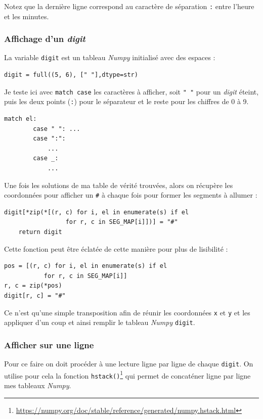 Notez que la dernière ligne correspond au caractère de séparation \og \texttt{:}\fg{} entre l'heure et les minutes.
\medskip

\subsubsection*{\textbullet{} Affichage d'un \textit{digit}}
La variable \texttt{digit} est un tableau \textit{Numpy} initialisé avec des espaces :
\begin{verbatim}
digit = full((5, 6), [" "],dtype=str)
\end{verbatim}
\medskip

Je teste ici avec \texttt{match case} les caractères à afficher, soit \texttt{" "} pour un \textit{digit} \og éteint\fg{}, puis les deux points (\og \texttt{:}\fg{}) pour le séparateur et le reste pour les chiffres de 0 à 9.
\begin{verbatim}
match el:
        case " ": ...
        case ":":
            ...
        case _:
            ...
\end{verbatim}
\medskip

Une fois les solutions de ma table de vérité trouvées, alors on récupère les coordonnées pour afficher un \og \texttt{\#}\fg{} à chaque fois pour former les segments à allumer :
\begin{lstlisting}
digit[*zip(*[(r, c) for i, el in enumerate(s) if el
                 for r, c in SEG_MAP[i]])] = "#"
    return digit
\end{lstlisting}
\medskip

Cette fonction peut être éclatée de cette manière pour plus de lisibilité :
\begin{lstlisting}
pos = [(r, c) for i, el in enumerate(s) if el 
           for r, c in SEG_MAP[i]]
r, c = zip(*pos)
digit[r, c] = "#"
\end{lstlisting}
\medskip

Ce n'est qu'une simple transposition afin de réunir les coordonnées \texttt{x} et \texttt{y} et les appliquer d'un coup et ainsi remplir le tableau \textit{Numpy} \texttt{digit}.
\medskip

\subsubsection*{\textbullet{} Afficher sur une ligne}
Pour ce faire on doit procéder à une lecture ligne par ligne de chaque \texttt{digit}. On utilise pour cela la fonction \texttt{hstack()}\footnote{\url{https://numpy.org/doc/stable/reference/generated/numpy.hstack.html}} qui permet de concaténer ligne par ligne mes tableaux \textit{Numpy}.
\medskip

